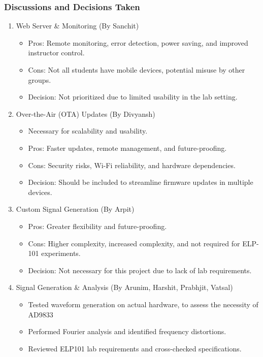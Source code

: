 \documentclass[12pt,a4paper]{article}
\begin{document}
\subsubsection*{Discussions and Decisions Taken}
\begin{enumerate}
    \item Web Server & Monitoring (By Sanchit)
    \begin{itemize}
        \item Pros: Remote monitoring, error detection, power saving, and improved instructor control.
        \item Cons: Not all students have mobile devices, potential misuse by other groups.
        \item Decision: Not prioritized due to limited usability in the lab setting.
    \end{itemize}
    \item Over-the-Air (OTA) Updates (By Divyansh)
    \begin{itemize}
        \item Necessary for scalability and usability.
        \item Pros: Faster updates, remote management, and future-proofing.
        \item Cons: Security risks, Wi-Fi reliability, and hardware dependencies.
        \item Decision: Should be included to streamline firmware updates in multiple devices.
    \end{itemize}
    \item Custom Signal Generation (By Arpit)
    \begin{itemize}
        \item Pros: Greater flexibility and future-proofing.
        \item Cons: Higher complexity, increased complexity, and not required for ELP-101 experiments.
        \item Decision: Not necessary for this project due to lack of lab requirements.
    \end{itemize}
    \item Signal Generation & Analysis (By Arunim, Harshit, Prabhjit, Vatsal)
    \begin{itemize}
        \item Tested waveform generation on actual hardware, to assess the necessity of AD9833
        \item Performed Fourier analysis and identified frequency distortions.
        \item Reviewed ELP101 lab requirements and cross-checked specifications.
    \end{itemize}



\end{enumerate}
\end{document}
